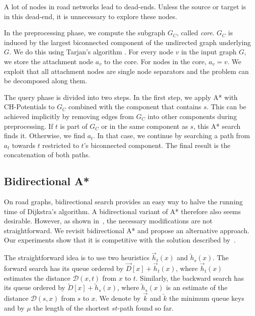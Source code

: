 \documentclass[manuscript,review]{acmart}
\newcommand*{\dist}{\mathcal{D}}
\begin{document}
A lot of nodes in road networks lead to dead-ends.
Unless the source or target is in this dead-end, it is unnecessary to explore these nodes.

In the preprocessing phase, we compute the subgraph $G_C$, called \emph{core}.
$G_C$ is induced by the largest biconnected component of the undirected graph underlying $G$.
We do this using Tarjan's algorithm \cite{t-dfslg2-72}.
For every node $v$ in the input graph $G$, we store the attachment node $a_v$ to the core.
For nodes in the core, $a_v=v$.
We exploit that all attachment nodes are single node separators and the problem can be decomposed along them.

The query phase is divided into two steps.
In the first step, we apply A* with CH-Potentials to $G_C$ combined with the component that contains $s$.
This can be achieved implicitly by removing edges from $G_C$ into other components during preprocessing.
If $t$ is part of $G_C$ or in the same component as $s$, this A* search finds it.
Otherwise, we find $a_t$.
In that case, we continue by searching a path from $a_t$ towards $t$ restricted to $t$'s biconnected component.
The final result is the concatenation of both paths.

\subsection{Bidirectional A*}\label{sec:bidir_astar}

On road graphs, bidirectional search provides an easy way to halve the running time of Dijkstra's algorithm.
A bidirectional variant of A* therefore also seems desirable.
However, as shown in~\cite{gh-cspas-05}, the necessary modifications are not straightforward.
We revisit bidirectional A* and propose an alternative approach.
Our experiments show that it is competitive with the solution described by~\cite{gh-cspas-05}.

The straightforward idea is to use two heuristics $\overrightarrow{h}_t(x)$ and $\overleftarrow{h}_s(x)$.
The forward search has its queue ordered by $\overrightarrow{D}[x] + \overrightarrow{h}_t(x)$, where $\overrightarrow{h}_t(x)$ estimates the distance $\dist(x,t)$ from $x$ to $t$.
Similarly, the backward search has its queue ordered by $\overleftarrow{D}[x] + \overleftarrow{h}_s(x)$, where $\overleftarrow{h}_s(x)$ is an estimate of the distance $\dist(s,x)$ from $s$ to $x$.
We denote by $\overrightarrow{k}$ and $\overleftarrow{k}$ the minimum queue keys and by $\mu$ the length of the shortest $st$-path found so far.
\end{document}
